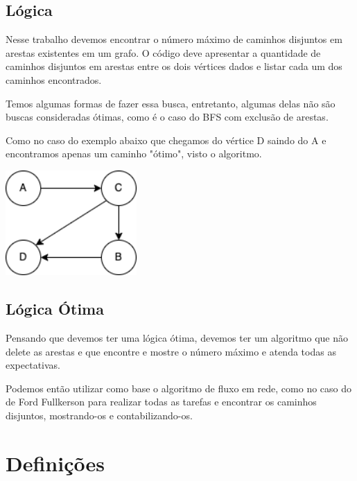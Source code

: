 

\subsection{Lógica}

Nesse trabalho devemos encontrar o número máximo de caminhos disjuntos em arestas existentes em um grafo. O código deve apresentar a quantidade de caminhos disjuntos em arestas entre os dois vértices dados e listar cada um dos caminhos encontrados.

Temos algumas formas de fazer essa busca, entretanto, algumas delas não são buscas consideradas ótimas, como é o caso do BFS com exclusão de arestas.

Como no caso do exemplo abaixo que chegamos do vértice D saindo do A e encontramos apenas um caminho "ótimo", visto o algoritmo.
\begin{center}
\includegraphics[width=5cm, height=4cm]{figuras/01.png}
\end{center}

\subsection{Lógica Ótima}
Pensando que devemos ter uma lógica ótima, devemos ter um algoritmo que não delete as arestas e que encontre e mostre o número máximo e atenda todas as expectativas.

Podemos então utilizar como base o algoritmo de fluxo em rede, como no caso do de Ford Fullkerson para realizar todas as tarefas e encontrar os caminhos disjuntos, mostrando-os e contabilizando-os.

\section{Definições}

